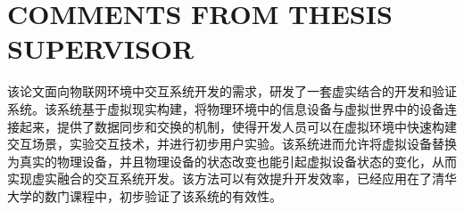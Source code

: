 
\chapter{\MakeUppercase{Comments from thesis supervisor}}

该论文面向物联网环境中交互系统开发的需求，研发了一套虚实结合的开发和验证系统。该系统基于虚拟现实构建，将物理环境中的信息设备与虚拟世界中的设备连接起来，提供了数据同步和交换的机制，使得开发人员可以在虚拟环境中快速构建交互场景，实验交互技术，并进行初步用户实验。该系统进而允许将虚拟设备替换为真实的物理设备，并且物理设备的状态改变也能引起虚拟设备状态的变化，从而实现虚实融合的交互系统开发。该方法可以有效提升开发效率，已经应用在了清华大学的数门课程中，初步验证了该系统的有效性。